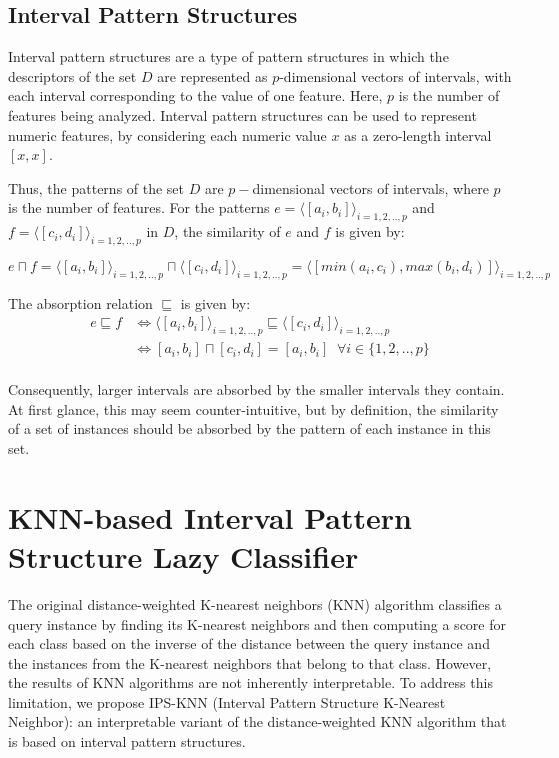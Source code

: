 \documentclass[
]{ceurart}
\begin{document}
\subsection{Interval Pattern Structures}
Interval pattern structures \cite{kuznetsov2013fitting, kaytoue2011mining} are a type of pattern structures in which the descriptors of the set $D$ are represented as $p$-dimensional vectors of intervals, with each interval corresponding to the value of one feature. Here, $p$ is the number of features being analyzed. Interval pattern structures can be used to represent numeric features, by considering each numeric value $x$ as a zero-length interval $[x, x]$. 

Thus, the patterns of the set $D$ are $p-$dimensional vectors of intervals, where $p$ is the number of features. For the patterns $e = \langle[a_i, b_i]\rangle_{i=1, 2, .., p}$ and $f = \langle[c_i, d_i]\rangle_{i=1, 2, .., p}$ in $D$, the similarity of $e$ and $f$ is given by:

\begin{equation}
    e \sqcap f = \langle[a_i, b_i]\rangle_{i=1, 2, .., p} \sqcap \langle[c_i, d_i]\rangle_{i=1, 2, .., p} =\langle[min(a_i, c_i), max(b_i, d_i)]\rangle_{i=1, 2, .., p}
\end{equation}

The absorption relation $\sqsubseteq$ is given by:
\begin{equation}
  \begin{aligned}
    e \sqsubseteq f & \iff \langle[a_i, b_i]\rangle_{i=1, 2, .., p} \sqsubseteq \langle[c_i, d_i]\rangle_{i=1, 2, .., p}\\
      & \iff [a_i, b_i] \sqcap [c_i, d_i] = [a_i, b_i] \;\; \forall i \in \{ 1, 2, .., p\}\\
  \end{aligned}
\end{equation}

Consequently, larger intervals are absorbed by the smaller intervals they contain. At first glance, this may seem counter-intuitive, but by definition, the similarity of a set of instances should be absorbed by the pattern of each instance in this set.


\section{KNN-based Interval Pattern Structure Lazy Classifier}
The original distance-weighted K-nearest neighbors (KNN) algorithm \cite{aha1991instance} classifies a query instance by finding its K-nearest neighbors and then computing a score for each class based on the inverse of the distance between the query instance and the instances from the K-nearest neighbors that belong to that class. However, the results of KNN algorithms are not inherently interpretable. To address this limitation, we propose IPS-KNN (Interval Pattern Structure K-Nearest Neighbor): an interpretable variant of the distance-weighted KNN algorithm that is based on interval pattern structures.
\end{document}
